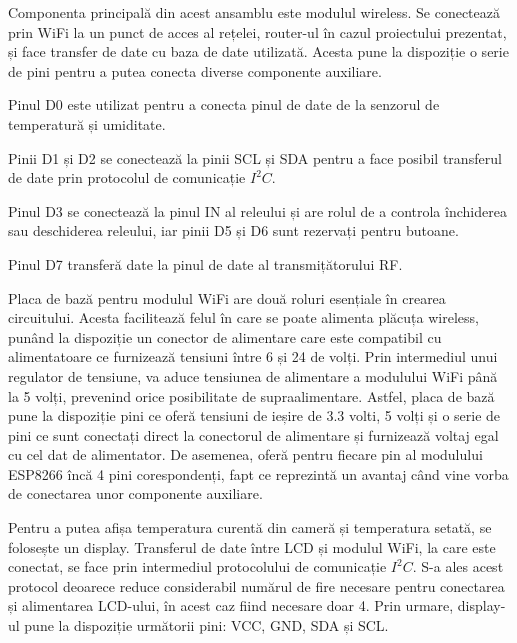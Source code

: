 	Componenta principală din acest ansamblu este modulul wireless. Se conectează prin WiFi la un punct de acces al rețelei, router-ul în cazul proiectului prezentat, și face transfer de date cu baza de date utilizată. Acesta pune la dispoziție o serie de pini pentru a putea conecta diverse componente auxiliare. 
	
	Pinul D0 este utilizat pentru a conecta pinul de date de la senzorul de temperatură și umiditate.

	Pinii D1 și D2 se conectează la pinii SCL și SDA pentru a face posibil transferul de date prin protocolul de comunicație $I^2C$.

	Pinul D3 se conectează la pinul IN al releului și are rolul de a controla închiderea sau deschiderea releului, iar pinii D5 și D6 sunt rezervați pentru butoane. 

	Pinul D7 transferă date la pinul de date al transmițătorului RF. 

\vspace{1em}

	Placa de bază pentru modulul WiFi are două roluri esențiale în crearea circuitului. Acesta facilitează felul în care se poate alimenta plăcuța wireless, punând la dispoziție un conector de alimentare care este compatibil cu alimentatoare ce furnizează tensiuni între 6 și 24 de volți. Prin intermediul unui regulator de tensiune, va aduce tensiunea de alimentare a modulului WiFi până la 5 volți, prevenind orice posibilitate de supraalimentare. Astfel, placa de bază pune la dispoziție pini ce oferă tensiuni de ieșire de 3.3 volti, 5 volți și o serie de pini ce sunt conectați direct la conectorul de alimentare și furnizează voltaj egal cu cel dat de alimentator. De asemenea, oferă pentru fiecare pin al modulului ESP8266 încă 4 pini corespondenți, fapt ce reprezintă un avantaj când vine vorba de conectarea unor componente auxiliare.

\vspace{1em}

	Pentru a putea afișa temperatura curentă din cameră și temperatura setată, se folosește un display. Transferul de date între LCD și modulul WiFi, la care este conectat, se face prin intermediul protocolului de comunicație $I^2C$. S-a ales acest protocol deoarece reduce considerabil numărul de fire necesare pentru conectarea și alimentarea LCD-ului, în acest caz fiind necesare doar 4. Prin urmare, display-ul pune la dispoziție următorii pini:  VCC, GND, SDA și SCL.

\vspace{1em}

